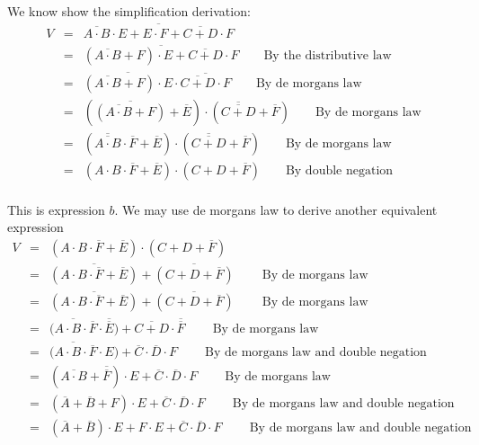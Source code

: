\documentclass[11pt,reqno]{article}
\begin{document}
\noindent We know show the simplification derivation:
\begin{eqnarray*}
 V &=& \overline{ \overline{A \cdot B} \cdot E + E \cdot F + \overline{C + D} \cdot F } \\
     &=& \overline{ (\overline{A \cdot B} + F ) \cdot E + \overline{C + D} \cdot F } \qquad \text{By the distributive law}\\
     &=& \overline{(\overline{A \cdot B} + F ) \cdot E} \cdot \overline {\overline{C + D} \cdot F} \qquad \text{By de morgans law}\\
     &=& (\overline{(\overline{A \cdot B} + F )} + \overline{E}) \cdot (\overline {\overline{C + D}} + \overline{F}) \qquad \text{By de morgans law}\\
     &=& (\overline{\overline{A \cdot B}} \cdot \overline{F} + \overline{E}) \cdot (\overline {\overline{C + D}} + \overline{F}) \qquad \text{By de morgans law}\\
     &=& (A \cdot B \cdot \overline{F} + \overline{E}) \cdot (C + D + \overline{F}) \qquad \text{By double negation}\\
\end{eqnarray*}

\noindent This is expression $b$. We may use de morgans law to derive another equivalent expression
\begin{eqnarray*}
 V &=& (A \cdot B \cdot \overline{F} + \overline{E}) \cdot (C + D + \overline{F}) \\
     &=& \overline{(A \cdot B \cdot \overline{F} + \overline{E})} + \overline{(C + D + \overline{F})} \ \qquad \text{By de morgans law} \\
     &=& \overline{(A \cdot B \cdot \overline{F} + \overline{E})} + \overline{(C + D + \overline{F})} \ \qquad \text{By de morgans law} \\
     &=&\overline{(A \cdot B \cdot \overline{F}} \cdot \overline{\overline{E}}) + \overline{C + D} \cdot \overline{\overline{F}} \ \qquad \text{By de morgans law} \\
     &=&\overline{(A \cdot B \cdot \overline{F}} \cdot E) + \overline{C} \cdot \overline{D} \cdot F \ \qquad \text{By de morgans law and double negation} \\
     &=&(\overline{A \cdot B} + \overline{\overline{F}}) \cdot E + \overline{C} \cdot \overline{D} \cdot F \ \qquad \text{By de morgans law} \\
     &=&(\overline{A} + \overline{B} + F) \cdot E + \overline{C} \cdot \overline{D} \cdot F \ \qquad \text{By de morgans law and double negation} \\
     &=&(\overline{A} + \overline{B}) \cdot E + F \cdot E + \overline{C} \cdot \overline{D} \cdot F \ \qquad \text{By de morgans law and double negation} \\
\end{eqnarray*}
\end{document}
